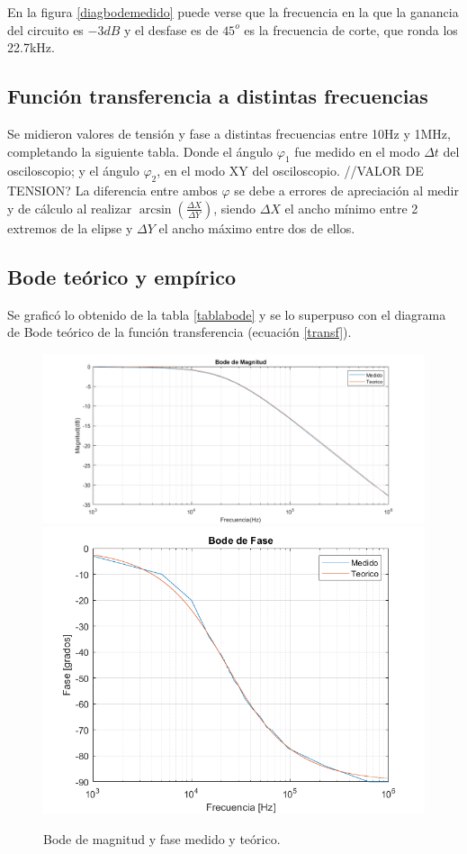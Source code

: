 En la figura \ref{diagbodemedido} puede verse que la frecuencia en la que la ganancia del circuito es $-3dB$ y el desfase es de $45^o$ es la frecuencia de corte, que ronda los 22.7kHz.

\subsection{Función transferencia a distintas frecuencias}

Se midieron valores de tensión y fase a distintas frecuencias entre 10Hz y 1MHz, completando la siguiente tabla. Donde el ángulo $\varphi_1$ fue medido en el modo $\Delta t$ del osciloscopio; y el ángulo $\varphi_2$, en el modo XY del osciloscopio.
//VALOR DE TENSION? 
La diferencia entre ambos $\varphi$ se debe a errores de apreciación al medir y de cálculo al realizar $\arcsin(\frac{\Delta X}{\Delta Y})$, siendo $\Delta X$ el ancho mínimo entre 2 extremos de la elipse y $\Delta Y$ el ancho máximo entre dos de ellos. 

\label{tablabode}

\subsection{Bode teórico y empírico}
Se graficó lo obtenido de la tabla \ref{tablabode} y se lo superpuso con el diagrama de Bode teórico de la función transferencia (ecuación \ref{transf}).

\begin{figure}[H]
\centering
\includegraphics[scale=0.4]{1-4a.png}
\includegraphics[scale=0.5]{1-4b.png}
\caption{Bode de magnitud y fase medido y teórico.}
\label{diagbode}
\end{figure}

